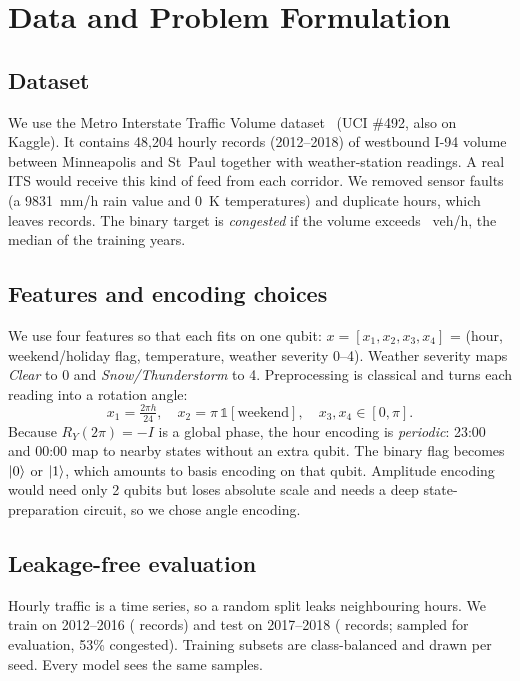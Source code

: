 \documentclass[conference]{IEEEtran}
\begin{document}
\section{Data and Problem Formulation}
\subsection{Dataset}
We use the Metro Interstate Traffic Volume dataset~\cite{hogue2019metro} (UCI \#492, also on Kaggle). It contains 48{,}204 hourly records (2012--2018) of westbound I-94 volume between Minneapolis and St~Paul together with weather-station readings. A real ITS would receive this kind of feed from each corridor. We removed sensor faults (a 9831~mm/h rain value and 0~K temperatures) and duplicate hours, which leaves \Nrows{} records. The binary target is \emph{congested} if the volume exceeds \Thr{}~veh/h, the median of the training years.

\subsection{Features and encoding choices}
We use four features so that each fits on one qubit: $x=[x_1,x_2,x_3,x_4]$ = (hour, weekend/holiday flag, temperature, weather severity 0--4). Weather severity maps \emph{Clear} to 0 and \emph{Snow/Thunderstorm} to 4. Preprocessing is classical and turns each reading into a rotation angle:
\begin{equation}
x_1=\tfrac{2\pi h}{24},\quad x_2=\pi\,\mathbb{1}[\text{weekend}],\quad x_3,x_4\in[0,\pi].
\label{eq:angles}
\end{equation}
Because $R_Y(2\pi)=-I$ is a global phase, the hour encoding is \emph{periodic}: 23:00 and 00:00 map to nearby states without an extra qubit. The binary flag becomes $\ket{0}$ or $\ket{1}$, which amounts to basis encoding on that qubit. Amplitude encoding would need only 2 qubits but loses absolute scale and needs a deep state-preparation circuit, so we chose angle encoding.

\subsection{Leakage-free evaluation}
Hourly traffic is a time series, so a random split leaks neighbouring hours. We train on 2012--2016 (\Npool{} records) and test on 2017--2018 (\Ntest{} records; \Nused{} sampled for evaluation, 53\% congested). Training subsets are class-balanced and drawn per seed. Every model sees the same samples.
\end{document}
